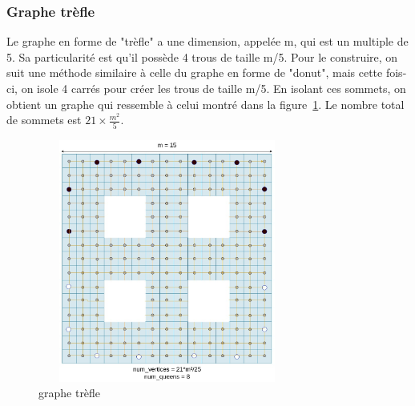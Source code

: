 \documentclass[11pt]{article}
\begin{document}
            \subsubsection{Graphe trèfle}
            Le graphe en forme de "trèfle" a une dimension, appelée m, qui est un multiple de 5. Sa particularité est qu'il possède 4 trous de taille m/5. Pour le construire, on suit une méthode similaire à celle du graphe en forme de "donut", mais cette fois-ci, on isole 4 carrés pour créer les trous de taille m/5. En isolant ces sommets, on obtient un graphe qui ressemble à celui montré dans la figure~\ref{fig:grapht}. Le nombre total de sommets est $21\times \frac{m^{2}}{5}$.
            \begin{figure}[h]
                \centering
                \includegraphics[width = 8.5cm, height = 8cm]{graphe_trefle (2).jpg}
                \caption{graphe trèfle}
                \label{fig:grapht}
            \end{figure}
\end{document}
